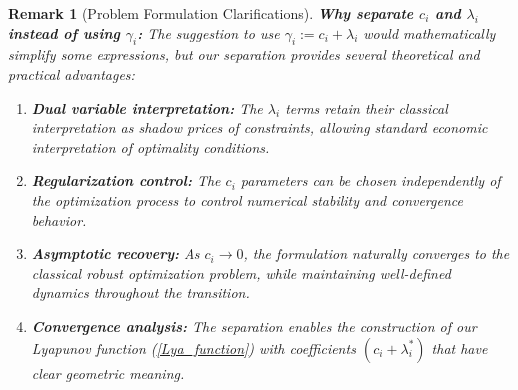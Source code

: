 \documentclass[journal,twoside,web]{ieeecolor}
\newtheorem{remark}{Remark}
\begin{document}
{\begin{remark}[Problem Formulation Clarifications]
{\color{blue} \textbf{Why separate $c_i$ and $\lambda_i$ instead of using $\gamma_i$:} The suggestion to use $\gamma_i := c_i + \lambda_i$ would mathematically simplify some expressions, but our separation provides several theoretical and practical advantages:
\begin{enumerate}
\item \textbf{Dual variable interpretation:} The $\lambda_i$ terms retain their classical interpretation as shadow prices of constraints, allowing standard economic interpretation of optimality conditions.
\item \textbf{Regularization control:} The $c_i$ parameters can be chosen independently of the optimization process to control numerical stability and convergence behavior.
\item \textbf{Asymptotic recovery:} As $c_i \to 0$, the formulation naturally converges to the classical robust optimization problem, while maintaining well-defined dynamics throughout the transition.
\item \textbf{Convergence analysis:} The separation enables the construction of our Lyapunov function (\ref{Lya_function}) with coefficients $(c_i + \lambda_i^*)$ that have clear geometric meaning.
\end{enumerate}

}
\end{remark}}
\end{document}
